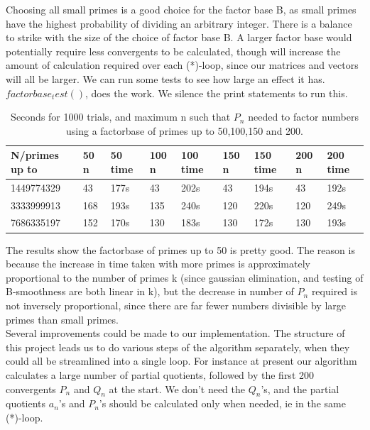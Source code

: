 \documentclass[10pt,a4paper]{report}
\begin{document}
Choosing all small primes is a good choice for the factor base B, as small primes have the highest probability of dividing an arbitrary integer. There is a balance to strike with the size of the choice of factor base B. A larger factor base would potentially require less convergents to be calculated, though will increase the amount of calculation required over each (*)-loop, since our matrices and vectors will all be larger. We can run some tests to see how large an effect it has. $factorbase_test()$, does the work. We silence the print statements to run this.\\

\begin{table}[h]
\centering
\begin{tabular}{|l|l|l|l|l|l|l|l|l|}
\hline
N/primes up to & 50 n & 50 time & 100 n & 100 time & 150 n & 150 time & 200 n & 200 time \\ \hline
1449774329     & 43   & 177s    & 43    & 202s     & 43    & 194s     & 43    & 192s     \\ \hline
3333999913     & 168  & 193s    & 135   & 240s     & 120   & 220s     & 120   & 249s     \\ \hline
7686335197     & 152  & 170s    & 130   & 183s     & 130   & 172s     & 130   & 193s     \\ \hline
\end{tabular}
\caption{Seconds for 1000 trials, and maximum n such that $P_n$ needed to factor numbers using a factorbase of primes up to 50,100,150 and 200.}
\end{table}


The results show the factorbase of primes up to 50 is pretty good. The reason is because the increase in time taken with more primes is approximately proportional to the number of primes k (since gaussian elimination, and testing of B-smoothness are both linear in k), but the decrease in number of $P_n$ required is not inversely proportional, since there are far fewer numbers divisible by large primes than small primes.\\


Several improvements could be made to our implementation. The structure of this project leads us to do various steps of the algorithm separately, when they could all be streamlined into a single loop. For instance at present our algorithm calculates a large number of partial quotients, followed by the first 200 convergents $P_n$ and $Q_n$ at the start. We don't need the $Q_n$'s, and the partial quotients $a_n$'s and $P_n$'s should be calculated only when needed, ie in the same (*)-loop. 
\end{document}
